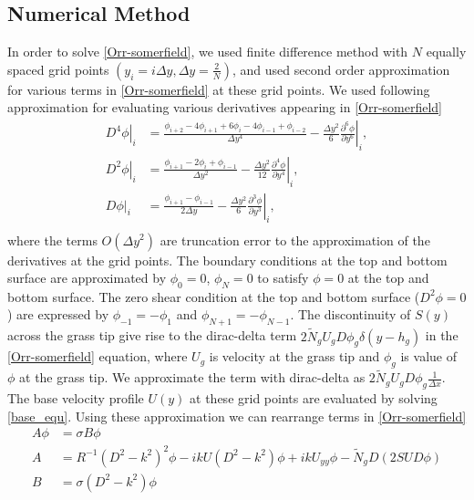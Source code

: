 \documentclass[12pt]{report}   %
\newcommand{\del}{\partial}
\newcommand{\Rey}{{R}}
\newcommand{\Ndg}{\tilde{N}_g}
\begin{document}
\subsection{Numerical Method}
  In order to solve \eqref{Orr-somerfield}, we used finite difference method with $N$ equally spaced grid points $(y_i = i\Delta y, \Delta y = \frac{2}{N})$, and used second order approximation for various terms in \eqref{Orr-somerfield} at these grid points. We used following approximation for evaluating various derivatives appearing in \eqref{Orr-somerfield}
  \begin{equation}
  \begin{align}
    \left.{ D^4\phi} \right|_i &= \frac{ \phi_{i+2}-4\phi_{i+1}+6\phi_{i}-4\phi_{i-1}+\phi_{i-2} }{\Delta y^4} - \frac{\Delta y^2}{6} \left. \frac{\del^6 \phi}{\del y^6} \right |_i, \\
    \left. D^2\phi \right|_i &=  \frac{\phi_{i+1} -2\phi_i +\phi_{i-1}}{\Delta y^2} - \left. \frac{\Delta y^2}{12} \frac{\del^4 \phi}{\del y^4} \right|_i ,\\    
    \left. D\phi \right|_i &=  \frac{\phi_{i+1} -\phi_{i-1}}{2\Delta y} - \left. \frac{\Delta y^2}{6} \frac{\del^3 \phi}{\del y^3} \right|_i, \\
    \end{align}
  \end{equation}
where the terms $O(\Delta y^2)$ are truncation error to the approximation of the derivatives at the grid points.
The boundary conditions at the top and bottom surface are approximated by $\phi_0 = 0$,  $\phi_{N} = 0$ to satisfy $\phi=0$ at the top and bottom surface.
The zero shear condition at the top and bottom surface ($D^2\phi=0$) are expressed by $\phi_{-1} = -\phi_{1}$ and $\phi_{N+1} = -\phi_{N-1}$. The discontinuity of $S(y)$ across the grass tip give rise to the dirac-delta term $2\Ndg U_g D\phi_g \delta(y-h_g)$ in the \ref{Orr-somerfield} equation, where $U_g$ is velocity at the grass tip and $\phi_g$ is value of $\phi$ at the grass tip. We approximate the term with dirac-delta as $2\Ndg U_g D\phi_{g} \frac{1}{\Delta x}$.
The base velocity profile $U(y)$ at these grid points are evaluated by solving \eqref{base_equ}. Using these approximation we can rearrange terms in \eqref{Orr-somerfield} 
\begin{equation}
\begin{split}
A\phi &= \sigma B \phi\\
A &= \Rey^{-1}\left(D^2 -k^{2} \right)^2\phi-ikU \left(D^2-k^2\right)\phi + ik U_{yy}\phi -\Ndg D\left(2 S U D \phi\right)\\
B &= {\sigma} \left(D^2-k^2\right) \phi
\end{split}
\end{equation}
\end{document}
